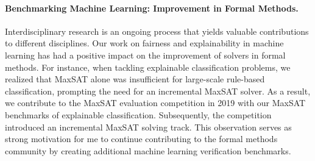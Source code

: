 \documentclass[10pt]{article}
\begin{document}
	
 
	
	
	
	\paragraph{Benchmarking Machine Learning: Improvement in Formal Methods.} Interdisciplinary research is an ongoing process that yields valuable contributions to different disciplines. Our work on fairness and explainability in machine learning has had a positive impact on the improvement of solvers in formal methods. For instance, when tackling explainable classification problems, we realized that MaxSAT alone was insufficient for large-scale rule-based classification, prompting the need for an incremental MaxSAT solver. As a result, we contribute to the MaxSAT evaluation competition in 2019 with our MaxSAT benchmarks of explainable classification. Subsequently, the competition introduced an incremental MaxSAT solving track. This observation serves as strong motivation for me to continue contributing to the formal methods community by creating additional machine learning verification benchmarks.
		 
	 
	
	\small
	
	
\end{document}
